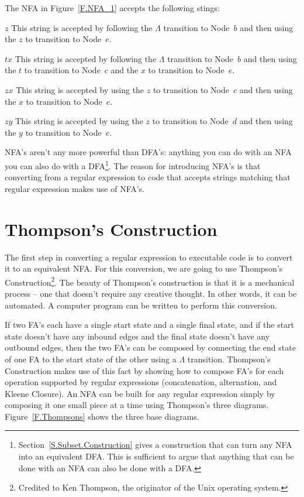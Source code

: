 \documentclass[letterpaper,12pt,openany,reqno]{book}%
\newenvironment{mydesc}[1][9em]
  {
     \begin{basedescript}
     {
      \renewcommand{\makelabel}[1]{\bfseries##1}
      \desclabelwidth{ #1 }
      \desclabelstyle{\multilinelabel}
     }
  }
  {
     \end{basedescript}%
  }
\begin{document}
The NFA in Figure~\ref{F.NFA_1} accepts the following stings:
\begin{mydesc}[2em]
	\item[$z$] This string is accepted by following the $\Lambda$ transition to Node~$b$ and then using the $z$ to transition to Node~$e$.
	\item[$tx$] This string is accepted by following the $\Lambda$ transition to Node~$b$ and then using the $t$ to transition to Node~$c$ and the $x$ to transition to Node~$e$.
	\item[$zx$] This string is accepted by using the $z$ to transition to Node~$c$ and then using the $x$ to transition to Node~$e$.
	\item[$zy$] This string is accepted by using the $z$ to transition to Node~$d$ and then using the $y$ to transition to Node~$e$.
\end{mydesc}

NFA's aren't any more powerful than DFA's: anything you can do with an NFA you can also do with a DFA\footnote{Section~\ref{S.Subset.Construction} gives a construction that can turn any NFA into an equivalent DFA. This is sufficient to argue that anything that can be done with an NFA can also be done with a DFA.}. The reason for introducing NFA's is that converting from a regular expression to code that accepts strings matching that regular expression makes use of NFA's.

\section{Thompson's Construction}

The first step in converting a regular expression to executable code is to convert it to an equivalent NFA. For this conversion, we are going to use Thompson's Construction\footnote{Credited to Ken Thompson, the originator of the Unix operating system.}. The beauty of Thompson's construction is that it is a mechanical process -- one that doesn't require any creative thought. In other words, it can be automated. A computer program can be written to perform this conversion.

If two FA's each have a single start state and a single final state, and if the start state doesn't have any inbound edges and the final state doesn't have any outbound edges, then the two FA's can be composed by connecting the end state of one FA to the start state of the other using a $\Lambda$ transition. Thompson's Construction makes use of this fact by showing how to compose FA's for each operation supported by regular expressions (concatenation, alternation, and Kleene Closure). An NFA can be built for any regular expression simply by composing it one small piece at a time using Thompson's three diagrams. Figure~\ref{F.Thompsons} shows the three base diagrams.
\end{document}
